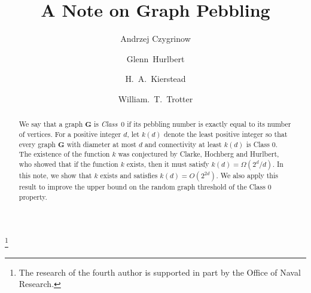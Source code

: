 \documentclass{amsart}
\theoremstyle{remark}
\newcommand{\bfG}{\mathbf{G}}
\begin{document}
\title[GRAPH PEBBLING]%
 {A Note on Graph Pebbling}
\author[A. CZYGRINOW]{Andrzej Czygrinow}
\address{Department of Mathematics\\
         Arizona State University\\
         Tempe, Arizona~85287\\
         U.S.A.}
\author[G. HURLBERT]{Glenn~Hurlbert}
\address{Department of Mathematics\\
         Arizona State University\\
         Tempe, Arizona~85287\\
         U.S.A.}
\author[H. A. KIERSTEAD]{H.~A.~Kierstead}
\address{Department of Mathematics\\
         Arizona State University\\
         Tempe, Arizona~85287\\
         U.S.A.}
\author[W. T. TROTTER]{William.~T.~Trotter}
\address{Department of Mathematics\\
         Arizona State University\\
         Tempe, Arizona~85287\\
         U.S.A.}
\thanks{The research of the fourth author is supported in part by
 the Office of Naval Research.}
\begin{abstract}
We say that a graph $\bfG$ is \textit{Class~$0$} if its pebbling
number is exactly equal to its number of vertices.
For a positive integer $d$, let $k(d)$ denote the least positive
integer so that every graph $\bfG$ with diameter
at most $d$ and connectivity at least $k(d)$ is Class 0.
The existence of the function $k$ was conjectured
by Clarke, Hochberg and Hurlbert, who showed that if the function
$k$ exists, then it must satisfy $k(d)=\Omega(2^d/d)$.  In this 
note, we show that $k$ exists and satisfies $k(d)=O(2^{2d})$.  
We also apply this result to improve the upper bound on the
random graph threshold of the Class 0 property.
\end{abstract}
\maketitle
\newpage
\end{document}
